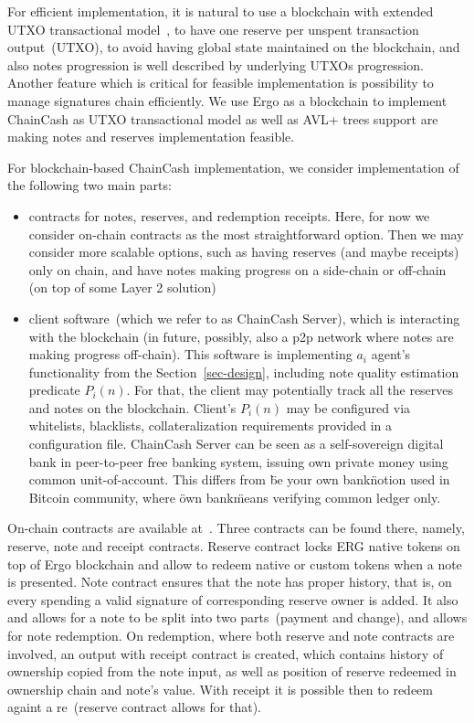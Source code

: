 \documentclass{llncs}   %
\newcommand{\cc}{ChainCash}
\begin{document}
For efficient implementation, it is natural to use a blockchain with extended UTXO transactional model~\cite{chakravarty2020extended}, to have one reserve per unspent transaction output~(UTXO), to
avoid having global state maintained on the blockchain, and also notes progression is well described by underlying UTXOs progression. Another feature which is critical for feasible implementation is
possibility to manage signatures chain efficiently. We use Ergo as a blockchain to implement \cc{} as UTXO transactional model as well as AVL+ trees support are making notes and reserves implementation feasible.

For blockchain-based \cc{} implementation, we consider implementation of the following two main parts:

\begin{itemize}
  \item{} contracts for notes, reserves, and redemption receipts. Here, for now we consider on-chain contracts as the most
  straightforward option. Then we may consider more scalable options, such as having reserves (and maybe receipts) only
  on chain, and have notes making progress on a side-chain or off-chain (on top of some Layer 2 solution)
  \item{} client software~(which we refer to as \cc{} Server), which is interacting with the blockchain (in future, possibly, also a p2p network
  where notes are making progress off-chain). This software is implementing $a_i$ agent's functionality from the Section~\ref{sec-design},
  including note quality estimation predicate $P_i(n)$. For that, the client may potentially track all the reserves and notes on the blockchain.
  Client's $P_i(n)$ may be configured via whitelists, blacklists, collateralization requirements provided in a configuration file.
  \cc{} Server can be seen as a self-sovereign digital bank in peer-to-peer free banking system, issuing own private money using common unit-of-account. This differs from \"be your own bank\" notion used in Bitcoin community, where \"own bank\" means verifying common ledger only.
\end{itemize}

On-chain contracts are available at~\cite{contracts}. Three contracts can be found there, namely, reserve, note and receipt contracts. Reserve contract locks ERG native tokens on top of Ergo blockchain and allow to redeem native or custom tokens when a note is presented. Note contract ensures that the note has proper history, that is, on every spending a valid signature of corresponding reserve owner is added. It also and allows for a note to be split into two parts~(payment and change), and allows for note redemption.
On redemption, where both reserve and note contracts are involved, an output with receipt contract is created, which contains history of ownership copied from the note input, as well as position of reserve redeemed in ownership chain and note's value. With receipt it is possible then to redeem againt a re~(reserve contract allows for that).
\end{document}
